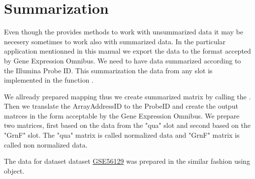 \section{Summarization}
Even though the  provides methods to work with unsummarized data it may be necesery sometimes to work also with summarized data. In the particular application mentionned in this manual we export the data to the format accepted by Gene Expression Omnibus. We need to have data summarized according to the Illumina Probe ID. This summarization the data from any slot is implemented in the function .

We allready prepared  mapping thus we create summarized matrix by calling the . Then we translate the ArrayAddressID to the ProbeID and create the output matrces in the form acceptable by the Gene Expression Omnibus. We prepare two matrices, first based on the data from the "qua" slot and second based on the "GrnF" slot. The "qua" matrix is called normalized data and "GrnF" matrix is called non normalized data.

The data for dataset dataset \href{http://www.ncbi.nlm.nih.gov/geo/query/acc.cgi?acc=GSE56129}{GSE56129} was prepared in the similar fashion using  object.